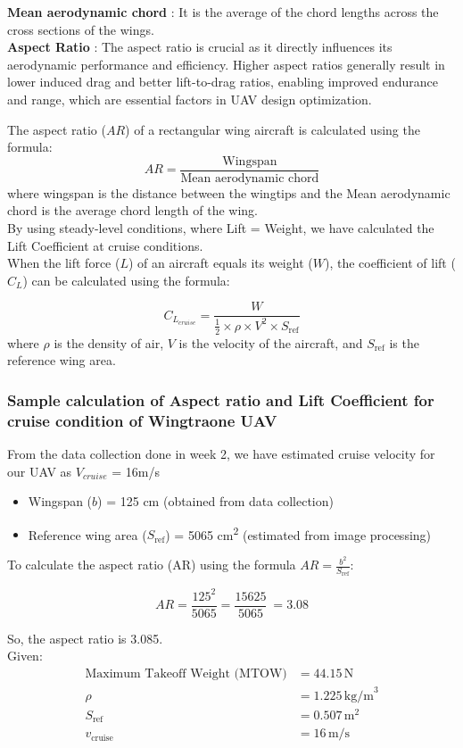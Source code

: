 \documentclass[12 pt]{article}
\begin{document}
\textbf{Mean aerodynamic chord} : It is the average of the chord lengths across the cross sections of the wings.\\

\textbf{Aspect Ratio} : The aspect ratio is crucial as it directly influences its aerodynamic performance and efficiency. Higher aspect ratios generally result in lower induced drag and better lift-to-drag ratios, enabling improved endurance and range, which are essential factors in UAV design optimization.

The aspect ratio ($AR$) of a rectangular wing aircraft is calculated using the formula:
\[
AR = \frac{{\text{Wingspan}}}{{\text{Mean aerodynamic chord}}}\]
where wingspan is the distance between the wingtips and the Mean aerodynamic chord is the average chord length of the wing.\\
By using steady-level conditions, where Lift = Weight, we have calculated the Lift Coefficient at cruise conditions.\\
When the lift force ($L$) of an aircraft equals its weight ($W$), the coefficient of lift ($C_L$) can be calculated using the formula:

\[
C_{L_{cruise}} = \frac{W}{\frac{1}{2} \times \rho \times V^2 \times S_{\text{ref}}}
\]
where $\rho$ is the density of air, $V$ is the velocity of the aircraft, and $S_{\text{ref}}$ is the reference wing area.
\subsubsection{Sample calculation of Aspect ratio and Lift Coefficient for cruise condition of Wingtraone UAV}
From the data collection done in week 2, we have estimated cruise velocity for our UAV as $V_{cruise}$ = 16m/s
\begin{itemize}
  \item Wingspan ($b$) = 125 cm (obtained from data collection)
  \item Reference wing area ($S_{\text{ref}}$) = 5065 cm\textsuperscript{2} (estimated from image processing)
\end{itemize} 

To calculate the aspect ratio (AR) using the formula $AR = \frac{b^2}{S_{\text{ref}}}$:

\[
AR = \frac{125^2}{5065} = \frac{15625}{5065} \ =  3.08
\]

So, the aspect ratio is 3.085.\\

Given:
\begin{align*}
    \text{Maximum Takeoff Weight (MTOW)} & = 44.15 \, \text{N} \\
    \rho & = 1.225 \, \text{kg/m}^3 \\
    S_{\text{ref}} & = 0.507 \, \text{m}^2 \\
    v_{\text{cruise}} & = 16 \, \text{m/s}
\end{align*}
\end{document}
